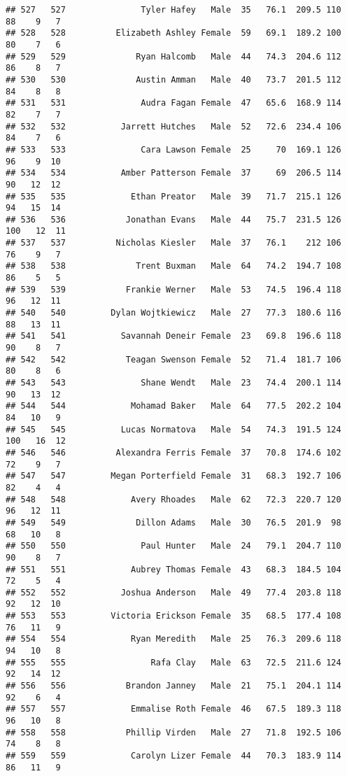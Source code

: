 \documentclass[
]{article}
\begin{document}
\begin{verbatim}
## 527   527               Tyler Hafey   Male  35   76.1  209.5 110  88    9   7
## 528   528          Elizabeth Ashley Female  59   69.1  189.2 100  80    7   6
## 529   529              Ryan Halcomb   Male  44   74.3  204.6 112  86    8   7
## 530   530              Austin Amman   Male  40   73.7  201.5 112  84    8   8
## 531   531               Audra Fagan Female  47   65.6  168.9 114  82    7   7
## 532   532           Jarrett Hutches   Male  52   72.6  234.4 106  84    7   6
## 533   533               Cara Lawson Female  25     70  169.1 126  96    9  10
## 534   534           Amber Patterson Female  37     69  206.5 114  90   12  12
## 535   535             Ethan Preator   Male  39   71.7  215.1 126  94   15  14
## 536   536            Jonathan Evans   Male  44   75.7  231.5 126 100   12  11
## 537   537          Nicholas Kiesler   Male  37   76.1    212 106  76    9   7
## 538   538              Trent Buxman   Male  64   74.2  194.7 108  86    5   5
## 539   539            Frankie Werner   Male  53   74.5  196.4 118  96   12  11
## 540   540         Dylan Wojtkiewicz   Male  27   77.3  180.6 116  88   13  11
## 541   541           Savannah Deneir Female  23   69.8  196.6 118  90    8   7
## 542   542            Teagan Swenson Female  52   71.4  181.7 106  80    8   6
## 543   543               Shane Wendt   Male  23   74.4  200.1 114  90   13  12
## 544   544             Mohamad Baker   Male  64   77.5  202.2 104  84   10   9
## 545   545           Lucas Normatova   Male  54   74.3  191.5 124 100   16  12
## 546   546          Alexandra Ferris Female  37   70.8  174.6 102  72    9   7
## 547   547         Megan Porterfield Female  31   68.3  192.7 106  82    4   4
## 548   548             Avery Rhoades   Male  62   72.3  220.7 120  96   12  11
## 549   549              Dillon Adams   Male  30   76.5  201.9  98  68   10   8
## 550   550               Paul Hunter   Male  24   79.1  204.7 110  90    8   7
## 551   551             Aubrey Thomas Female  43   68.3  184.5 104  72    5   4
## 552   552           Joshua Anderson   Male  49   77.4  203.8 118  92   12  10
## 553   553         Victoria Erickson Female  35   68.5  177.4 108  76   11   9
## 554   554             Ryan Meredith   Male  25   76.3  209.6 118  94   10   8
## 555   555                 Rafa Clay   Male  63   72.5  211.6 124  92   14  12
## 556   556            Brandon Janney   Male  21   75.1  204.1 114  92    6   4
## 557   557             Emmalise Roth Female  46   67.5  189.3 118  96   10   8
## 558   558            Phillip Virden   Male  27   71.8  192.5 106  74    8   8
## 559   559             Carolyn Lizer Female  44   70.3  183.9 114  86   11   9

\end{verbatim}
\end{document}
